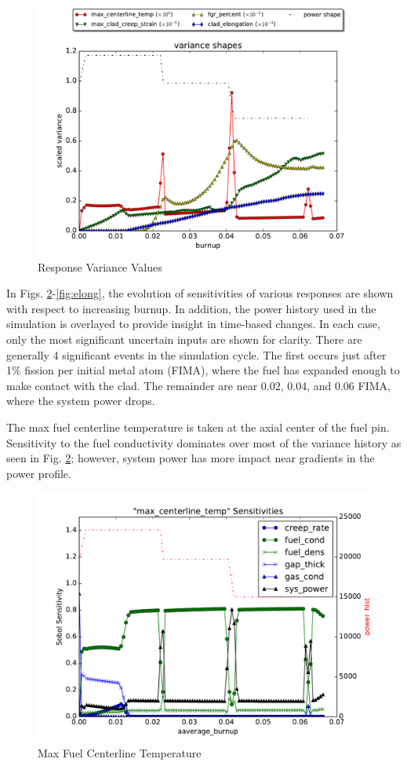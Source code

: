 \documentclass{anstrans} \usepackage{amsmath} \usepackage{amssymb}
\begin{document}
\begin{figure}[htb]
  \centering
  \includegraphics[width=\linewidth]{./varplots}
  \caption{Response Variance Values}
  \label{fig:variance}
\end{figure}

In Figs. \ref{fig:centerline}-\ref{fig:elong}, the evolution of sensitivities of various responses are shown
with respect to increasing burnup.  In addition, the power history used in the simulation is overlayed to
provide insight in time-based changes.  In each case, only the most significant uncertain inputs are shown
for clarity.  There are generally 4 significant events in the simulation cycle.  The first occurs just after
1\% fission per initial metal atom (FIMA), where the fuel has expanded enough to make contact with the clad.
The remainder are near 0.02, 0.04, and 0.06 FIMA, where the system power drops.

The max fuel centerline temperature is taken at the axial center of the fuel pin.  Sensitivity to the
fuel conductivity dominates over most of the variance history as seen in Fig. \ref{fig:centerline}; however, system
power has more impact near gradients in the power profile.
\begin{figure}[htb]
  \centering
  \includegraphics[width=\linewidth]{./sens_max_centerline_temp}
  \caption{Max Fuel Centerline Temperature}
  \label{fig:centerline}
\end{figure}
\end{document}
